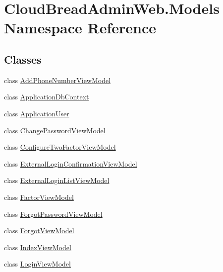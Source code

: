 \hypertarget{namespace_cloud_bread_admin_web_1_1_models}{}\section{Cloud\+Bread\+Admin\+Web.\+Models Namespace Reference}
\label{namespace_cloud_bread_admin_web_1_1_models}
\subsection*{Classes}
\begin{DoxyCompactItemize}
\item 
class \hyperlink{class_cloud_bread_admin_web_1_1_models_1_1_add_phone_number_view_model}{Add\+Phone\+Number\+View\+Model}
\item 
class \hyperlink{class_cloud_bread_admin_web_1_1_models_1_1_application_db_context}{Application\+Db\+Context}
\item 
class \hyperlink{class_cloud_bread_admin_web_1_1_models_1_1_application_user}{Application\+User}
\item 
class \hyperlink{class_cloud_bread_admin_web_1_1_models_1_1_change_password_view_model}{Change\+Password\+View\+Model}
\item 
class \hyperlink{class_cloud_bread_admin_web_1_1_models_1_1_configure_two_factor_view_model}{Configure\+Two\+Factor\+View\+Model}
\item 
class \hyperlink{class_cloud_bread_admin_web_1_1_models_1_1_external_login_confirmation_view_model}{External\+Login\+Confirmation\+View\+Model}
\item 
class \hyperlink{class_cloud_bread_admin_web_1_1_models_1_1_external_login_list_view_model}{External\+Login\+List\+View\+Model}
\item 
class \hyperlink{class_cloud_bread_admin_web_1_1_models_1_1_factor_view_model}{Factor\+View\+Model}
\item 
class \hyperlink{class_cloud_bread_admin_web_1_1_models_1_1_forgot_password_view_model}{Forgot\+Password\+View\+Model}
\item 
class \hyperlink{class_cloud_bread_admin_web_1_1_models_1_1_forgot_view_model}{Forgot\+View\+Model}
\item 
class \hyperlink{class_cloud_bread_admin_web_1_1_models_1_1_index_view_model}{Index\+View\+Model}
\item 
class \hyperlink{class_cloud_bread_admin_web_1_1_models_1_1_login_view_model}{Login\+View\+Model}
\item 

\end{DoxyCompactItemize}
